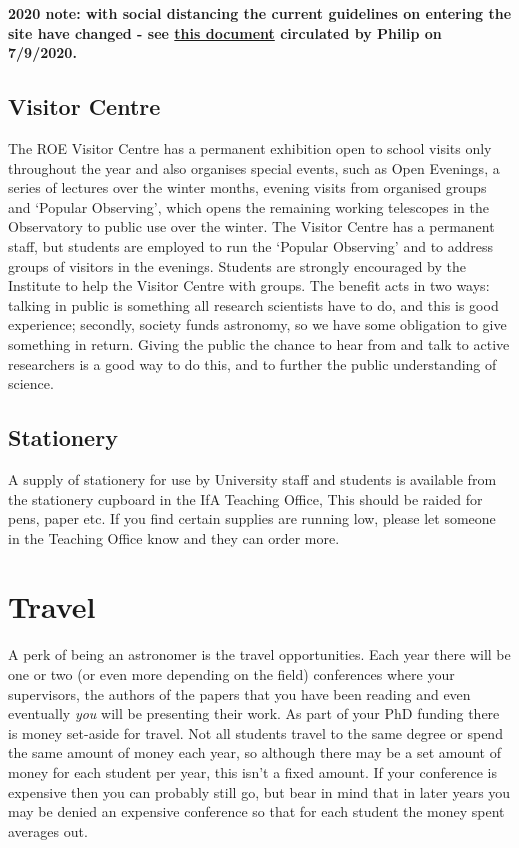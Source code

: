 {\bf 2020 note: with social distancing the current guidelines on entering the site have changed - see \href{https://tinyurl.com/yyvxhjcx}{this document} circulated by Philip on 7/9/2020.}

\subsection{Visitor Centre}

The ROE Visitor Centre has a permanent exhibition open to school
visits only throughout the year and also organises special events, such as Open Evenings, a series of lectures over the winter months, evening visits from organised groups and `Popular Observing', which opens the remaining working telescopes in the Observatory to public use over the
winter. The Visitor Centre has a permanent staff, but students are
employed to run the `Popular
Observing' and to address groups of visitors in the
evenings. Students are strongly encouraged by the Institute to help
the Visitor Centre with groups. The benefit acts in two ways: talking
in public is something all research scientists have to do, and this is
good experience; secondly, society funds astronomy, so we have some
obligation to give something in return. Giving the public the chance to
hear from and talk to active researchers is a good way to do this, and
to further the public understanding of science.

\subsection{Stationery}

A supply of stationery for use by University staff and students is
available from the stationery cupboard in the IfA Teaching Office,
This should be raided for pens, paper etc. If
you find certain supplies are running low, please let someone in the Teaching Office know and they can order more.

\section{Travel}

A perk of being an astronomer is the travel opportunities.  Each year
there will be one or two (or even more depending on the field)
conferences where your supervisors, the authors of the papers that you
have been reading and even eventually \emph{you} will be
presenting their work.  As part of your PhD funding there is money
set-aside for travel.  Not all students travel to the same degree or
spend the same amount of money each year, so although there may be a
set amount of money for each student per year, this isn't a fixed amount.  If your conference
is expensive then you can probably still go, but bear in mind that in
later years you may be denied an expensive conference so that for
each student the money spent averages out.

